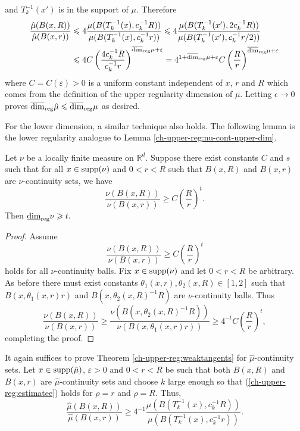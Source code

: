and $T_k^{-1}(x')$ is in the support of $\mu$.  Therefore
\begin{align*}
\frac{\hat{\mu}(B(x,R))}{\hat{\mu}(B(x,r))} &\le 4\frac{\mu (B(T_k^{-1}(x),c_k^{-1}R))}{\mu (B(T_k^{-1}(x),c_k^{-1}r))} \le 4\frac{\mu (B(T_k^{-1}(x'),2c_k^{-1}R))}{\mu (B(T_k^{-1}(x'),c_k^{-1}r/2))} \\
&\le 4C \left(\frac{4c_k^{-1}R}{c_k^{-1}r}\right)^{\r+ \varepsilon} =  4^{1+\r+ \varepsilon}C \left(\frac{R}{r}\right)^{\r+ \varepsilon}
\end{align*}
where $C= C(\varepsilon)>0$ is a uniform constant independent of $x$, $r$ and $R$ which comes from the definition of the upper regularity dimension of $\mu$. Letting $\epsilon \to 0$ proves  $\overline{\dim}_{\textup{reg}} \hat{\mu} \le \r$ as desired.

For the lower dimension, a similar technique also holds. The following lemma is the lower regularity analogue to Lemma \ref{ch-upper-reg:nu-cont-upper-dim}.

\begin{lemma}\label{ch-upper-reg:nu-cont-lower-dim}
	Let $\nu$ be a locally finite measure  on $ \mathbb{R}^d$. Suppose there exist constants $C$ and $s$ such that for all $x\in \textup{supp}(\nu)$ and $0<r<R$ such that $B(x,R)$ and $B(x,r)$ are $\nu$-continuity sets, we have
	\[
	\frac{\nu(B(x,R))}{\nu(B(x,r))} \geq C\left(\frac{R}{r}\right)^{t}.
	\]
	Then $\underline{\dim}_{\textup{reg}}  \nu \ge t.$
\end{lemma}

\begin{proof}
	Assume 
	\[
	\frac{\nu(B(x,R))}{\nu(B(x,r))} \geq C\left(\frac{R}{r}\right)^{t}
	\]
	holds for all $\nu$-continuity balls. Fix $x  \in \textup{supp}(\nu)$ and let $0<r<R$ be arbitrary. As before there must exist constants $\theta_1(x,r),\theta_2(x,R)\in[1,2]$ such that $B(x,\theta_1(x,r)r)$ and $B(x,\theta_2(x,R)^{-1} R)$ are $\nu$-continuity balls. Thus
	\[
	\frac{\nu(B(x,R))}{\nu(B(x,r))} \geq \frac{\nu(B(x,\theta_2(x,R)^{-1}R))}{\nu(B(x,\theta_1(x,r)r))} \ge 4^{-t} C \left(\frac{R}{r}\right)^{t},
	\]
	completing the proof.
\end{proof}

It again suffices to prove Theorem \ref{ch-upper-reg:weaktangents} for $\hat{\mu}$-continuity sets. Let $x \in \textup{supp}( \hat \mu)$, $\varepsilon > 0 $ and  $0<r<R$ be such that both $B(x,R)$ and $B(x,r)$ are $\hat \mu$-continuity sets and choose $k$ large enough so that  (\ref{ch-upper-reg:estimatee}) holds for $\rho=r$ and $\rho=R$. Thus,  
\[
\frac{\hat{\mu}(B(x,R))}{\hat{\mu}(B(x,r))} \ge 4^{-1}\frac{\mu (B(T_k^{-1}(x),c_k^{-1}R))}{\mu (B(T_k^{-1}(x),c_k^{-1}r))}.
\]

